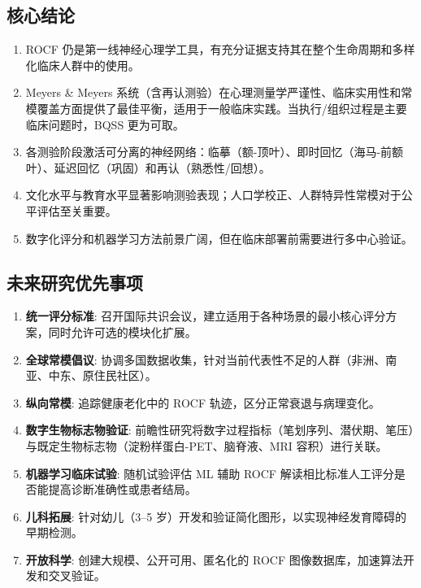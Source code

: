 \documentclass[12pt,a4paper]{ctexart}
\begin{document}
\subsection{核心结论}

\begin{enumerate}
\item ROCF 仍是第一线神经心理学工具，有充分证据支持其在整个生命周期和多样化临床人群中的使用。

\item Meyers \& Meyers 系统（含再认测验）在心理测量学严谨性、临床实用性和常模覆盖方面提供了最佳平衡，适用于一般临床实践。当执行/组织过程是主要临床问题时，BQSS 更为可取。

\item 各测验阶段激活可分离的神经网络：临摹（额-顶叶）、即时回忆（海马-前额叶）、延迟回忆（巩固）和再认（熟悉性/回想）。

\item 文化水平与教育水平显著影响测验表现；人口学校正、人群特异性常模对于公平评估至关重要。

\item 数字化评分和机器学习方法前景广阔，但在临床部署前需要进行多中心验证。
\end{enumerate}

\subsection{未来研究优先事项}

\begin{enumerate}
\item \textbf{统一评分标准}: 召开国际共识会议，建立适用于各种场景的最小核心评分方案，同时允许可选的模块化扩展。

\item \textbf{全球常模倡议}: 协调多国数据收集，针对当前代表性不足的人群（非洲、南亚、中东、原住民社区）。

\item \textbf{纵向常模}: 追踪健康老化中的 ROCF 轨迹，区分正常衰退与病理变化。

\item \textbf{数字生物标志物验证}: 前瞻性研究将数字过程指标（笔划序列、潜伏期、笔压）与既定生物标志物（淀粉样蛋白-PET、脑脊液、MRI 容积）进行关联。

\item \textbf{机器学习临床试验}: 随机试验评估 ML 辅助 ROCF 解读相比标准人工评分是否能提高诊断准确性或患者结局。

\item \textbf{儿科拓展}: 针对幼儿（3–5 岁）开发和验证简化图形，以实现神经发育障碍的早期检测。

\item \textbf{开放科学}: 创建大规模、公开可用、匿名化的 ROCF 图像数据库，加速算法开发和交叉验证。
\end{enumerate}
\end{document}
